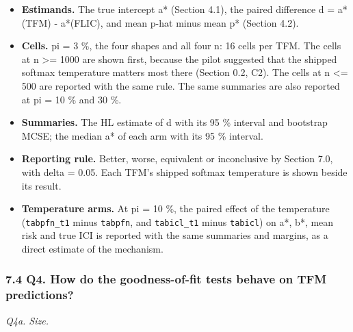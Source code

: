 \documentclass[
  10pt,
]{article}
\providecommand{\tightlist}{%
  \setlength{\itemsep}{0pt}\setlength{\parskip}{0pt}}
\begin{document}
\begin{itemize}
\tightlist
\item
  \textbf{Estimands.} The true intercept a* (Section 4.1),
  the paired difference d = \textbar a*\textbar(TFM) -
  \textbar a*\textbar(FLIC), and mean p-hat minus mean p*
  (Section 4.2).
\item
  \textbf{Cells.} pi = 3 \%, the four shapes and all four n:
  16 cells per TFM. The cells at n \textgreater= 1000 are
  shown first, because the pilot suggested that the shipped
  softmax temperature matters most there (Section 0.2, C2).
  The cells at n \textless= 500 are reported with the same
  rule. The same summaries are also reported at pi = 10 \%
  and 30 \%.
\item
  \textbf{Summaries.} The HL estimate of d with its 95 \%
  interval and bootstrap MCSE; the median a* of each arm
  with its 95 \% interval.
\item
  \textbf{Reporting rule.} Better, worse, equivalent or
  inconclusive by Section 7.0, with delta = 0.05. Each TFM's
  shipped softmax temperature is shown beside its result.
\item
  \textbf{Temperature arms.} At pi = 10 \%, the paired
  effect of the temperature (\texttt{tabpfn\_t1} minus
  \texttt{tabpfn}, and \texttt{tabicl\_t1} minus
  \texttt{tabicl}) on a*, b*, mean risk and true ICI is
  reported with the same summaries and margins, as a direct
  estimate of the mechanism.
\end{itemize}

\subsubsection{7.4 Q4. How do the goodness-of-fit tests
behave on TFM
predictions?}\label{q4.-how-do-the-goodness-of-fit-tests-behave-on-tfm-predictions}

\emph{Q4a. Size.}
\end{document}
